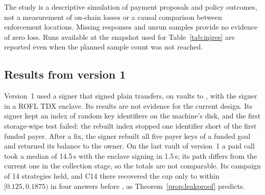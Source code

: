 The study is a descriptive simulation of payment proposals and policy outcomes, not a measurement of on-chain losses or a causal comparison
between enforcement locations. Missing responses and unrun samples provide no evidence of zero loss. Runs available at the snapshot used for
Table~\ref{tab:injres} are reported even when the planned sample count was not reached.

\subsection{Results from version 1}
\label{sec:v1}

Version~1 used a signer that signed plain transfers, on vaults  to , with the signer in a ROFL TDX
enclave. Its results are not evidence for the current design. Its signer kept an index of random key identifiers on the machine's disk, and the first
storage-wipe test failed: the rebuilt index stopped one identifier short of the first funded payer. After a fix, the signer rebuilt all five payer keys of a
funded goal and returned its balance to the owner. On the last vault of version~1 a paid call took a median of 14.5\,s with the enclave signing in 1.5\,s;
its path differs from the current one in the collection stage, so the totals are not comparable. Its campaign of 14 strategies held, and C14 there recovered the cap only to within
$[0.125, 0.1875)$ in four answers before , as Theorem~\ref{prop:leakproof} predicts.
